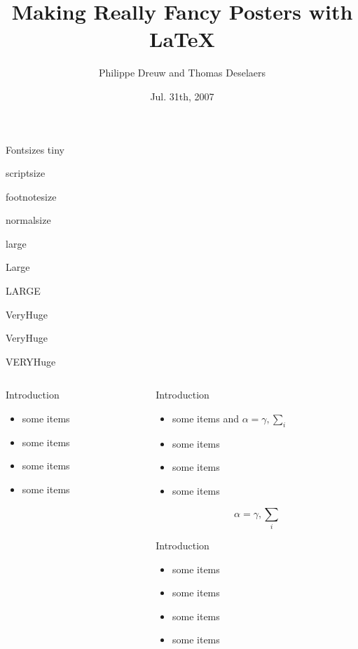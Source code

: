 \documentclass[final]{beamer}
\title[Fancy Posters]{Making Really Fancy Posters with \LaTeX}
\author[Dreuw \& Deselaers]{Philippe Dreuw and Thomas Deselaers}
\institute[RWTH Aachen University]{Human Language Technology and Pattern Recognition, RWTH Aachen University}
\date{Jul. 31th, 2007}
\begin{document}
\begin{frame}{} 
  \vfill
  \begin{block}{Fontsizes}
    \centering
    {\tiny tiny}\par
    {\scriptsize scriptsize}\par
    {\footnotesize footnotesize}\par
    {\normalsize normalsize}\par
    {\large large}\par
    {\Large Large}\par
    {\LARGE LARGE}\par
    {\veryHuge VeryHuge}\par
    {\VeryHuge VeryHuge}\par
    {\VERYHuge VERYHuge}\par
  \end{block}
  \vfill
  \begin{columns}[t]
    \begin{column}{.48\linewidth}
      \begin{block}{Introduction}
        \begin{itemize}
        \item some items
        \item some items
        \item some items
        \item some items
        \end{itemize}
      \end{block}
    \end{column}
    \begin{column}{.48\linewidth}
      \begin{block}{Introduction}
        \begin{itemize}
        \item some items and $\alpha=\gamma, \sum_{i}$
        \item some items
        \item some items
        \item some items
        \end{itemize}
        $$\alpha=\gamma, \sum_{i}$$
      \end{block}
      \begin{block}{Introduction}
        \begin{itemize}
        \item some items
        \item some items
        \item some items
        \item some items
        \end{itemize}
      \end{block}


\end{column}
\end{columns}
\end{frame}
\end{document}
